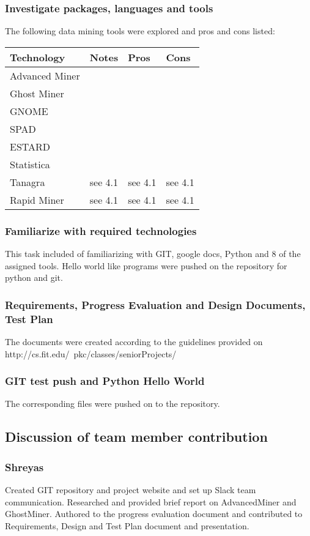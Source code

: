 \documentclass[11pt]{article}
\begin{document}
	\subsubsection{Investigate packages, languages and tools}
	The following data mining tools were explored and pros and cons listed: \\ 
	
	\begin{tabularx}{\textwidth}{|X|X|X|X|}
	\hline
	\textbf{Technology} & \textbf{Notes} & \textbf{Pros} & \textbf{Cons} \\ \hline
	Advanced Miner &&& \\ \hline
	Ghost Miner &&& \\ \hline
	GNOME &&&  \\ \hline
	SPAD &&&  \\ \hline
	ESTARD &&& \\ \hline
	Statistica &&& \\ \hline
	Tanagra & see 4.1 & see 4.1 & see 4.1 \\ \hline
	Rapid Miner & see 4.1 & see 4.1 & see 4.1 \\ \hline
	\end{tabularx}

	\subsubsection{Familiarize with required technologies}
	This task included of familiarizing with GIT, google docs, Python and 8 of the assigned tools. Hello world like programs were pushed on the repository for python and git.
	\subsubsection{Requirements, Progress Evaluation and Design Documents, Test Plan}
	The documents were created according to the guidelines provided on http://cs.fit.edu/~pkc/classes/seniorProjects/
	\subsubsection{GIT test push and Python Hello World}
	The corresponding files were pushed on to the repository.
	\subsection{Discussion of team member contribution}
	\subsubsection{Shreyas}
	Created GIT repository and project website and set up Slack team communication. Researched and provided brief report on AdvancedMiner and GhostMiner. Authored to the progress evaluation document and contributed to Requirements, Design and Test Plan document and presentation.
\end{document}

